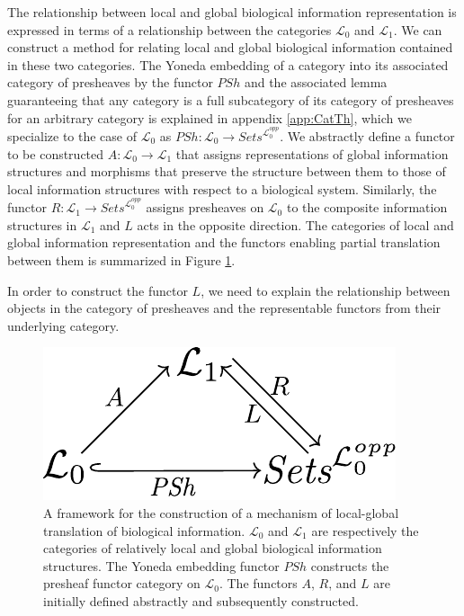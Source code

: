 \documentclass[aps,twocolumn]{revtex4-1}
\begin{document}
The relationship between local and global biological information representation is expressed in terms of a relationship between the categories $\mathcal{L}_0$ and $\mathcal{L}_1$. We can construct a method for relating local and global biological information contained in these two categories. The Yoneda embedding of a category into its associated category of presheaves by the functor $PSh$ and the associated lemma guaranteeing that any category is a full subcategory of its category of presheaves for an arbitrary category is explained in appendix \ref{app:CatTh}, which we specialize to the case of $\mathcal{L}_0$ as $PSh: \mathcal{L}_0 \rightarrow \textit{Sets}^{\mathcal{L}_0^{opp}}$. We abstractly define a functor to be constructed $A:\mathcal{L}_0 \rightarrow \mathcal{L}_1$ that assigns representations of global information structures and morphisms that preserve the structure between them to those of local information structures with respect to a biological system.  Similarly, the functor $R: \mathcal{L}_1 \rightarrow \textit{Sets}^{\mathcal{L}_0^{opp}}$ assigns presheaves on $\mathcal{L}_0$ to the composite information structures in $\mathcal{L}_1$ and $L$ acts in the opposite direction. The categories of local and global information representation and the functors enabling partial translation between them is summarized in Figure \ref{fig:ascent}.

In order to construct the functor $L$, we need to explain the relationship between objects in the category of presheaves and the representable functors from their underlying category.

\begin{figure}
\noindent\includegraphics[width=0.5\columnwidth]{fig/ascent.pdf}
\caption{A framework for the construction of a mechanism of local-global translation of biological information. $\mathcal{L}_0$ and $\mathcal{L}_1$ are respectively the categories of relatively local and global biological information structures. The Yoneda embedding functor $PSh$ constructs the presheaf functor category on $\mathcal{L}_0$. The functors $A$, $R$, and $L$ are initially defined abstractly and subsequently constructed.}
\label{fig:ascent}
\end{figure}
\end{document}
